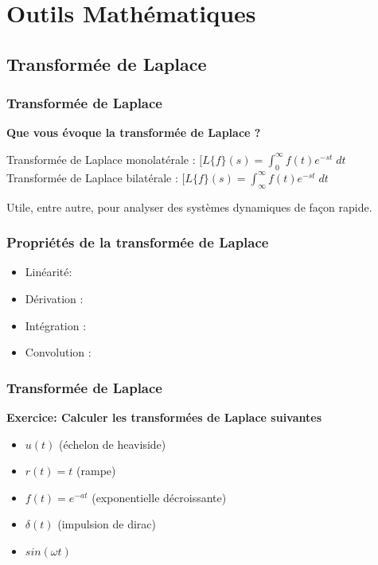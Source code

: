 \documentclass{beamer}
\begin{document}
\section{Outils Mathématiques}
\subsection{Transformée de Laplace}

\begin{frame}
\frametitle{Transformée de Laplace}
\textbf{Que vous évoque la transformée de Laplace ?}\\

\vspace{1cm}

{
	Transformée de Laplace monolatérale : $[L\{f\}(s) = \int^{\infty}_{0} f(t) e^{-st} \; dt$
	Transformée de Laplace bilatérale : $[L\{f\}(s) = \int^{\infty}_{\infty} f(t) e^{-st} \; dt$
}

{
\begin{block}{}
Utile, entre autre, pour analyser des systèmes dynamiques de façon rapide.
\end{block}
}

\end{frame}

\begin{frame}
\frametitle{Propriétés de la transformée de Laplace}
\begin{itemize}
\item<2-> Linéarité: 
\item<4-> Dérivation : 
\item<5-> Intégration : 
\item<7-> Convolution : 
\end{itemize}

\end{frame}

\begin{frame} 
\frametitle{Transformée de Laplace}

\textbf{Exercice: Calculer les transformées de Laplace suivantes}\\
\vspace{1cm}
\begin{itemize}
\item $u(t)$ (échelon de heaviside)
\item $r(t) = t$ (rampe)
\item $f(t) = e^{-at}$ (exponentielle décroissante)
\item $\delta (t)$ (impulsion de dirac) 
\item $sin(\omega t)$
\end{itemize}

\end{frame} 
\end{document}
